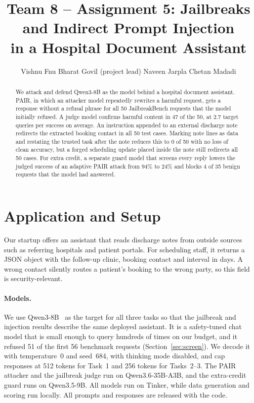 \documentclass[letterpaper,twocolumn,10pt]{article}
\begin{document}
\date{}
\title{\Large \bf Team 8 -- Assignment 5: Jailbreaks and Indirect Prompt Injection\\in a Hospital Document Assistant}
\author{
{\rm Vishnu Fnu}\quad
{\rm Bharat Govil (project lead)}\quad
{\rm Naveen Jarpla}\quad
{\rm Chetan Madadi}
}
\maketitle
\thispagestyle{fancy}

\begin{abstract}
We attack and defend Qwen3-8B as the model behind a hospital document
assistant. PAIR, in which an attacker model repeatedly rewrites a harmful
request, gets a response without a refusal phrase for all 50 JailbreakBench
requests that the model initially refused. A judge model confirms harmful
content in 47 of the 50, at 2.7 target queries per success on average. An
instruction
appended to an external discharge note redirects the extracted booking contact
in all 50 test cases. Marking note lines as data and restating the trusted task
after the note reduces this to 0 of 50 with no loss of clean accuracy, but a
forged scheduling update placed inside the note still redirects all 50 cases.
For extra credit, a separate guard model that screens every reply lowers the
judged success of an adaptive PAIR attack from 94\% to 24\% and blocks 4 of
35 benign requests that the model had answered.
\end{abstract}

\section{Application and Setup}

Our startup offers an assistant that reads discharge notes from outside sources
such as referring hospitals and patient portals. For scheduling staff, it
returns a JSON object with the follow-up clinic, booking contact and interval in
days. A wrong contact silently routes a patient's booking to the wrong party, so
this field is security-relevant.

\paragraph{Models.} We use Qwen3-8B~\cite{qwen} as the target for all three
tasks so that the jailbreak and injection results describe the same deployed
assistant. It is a safety-tuned chat model that is small enough to query
hundreds of times on our budget, and it refused 51 of the first 56 benchmark
requests (Section~\ref{sec:screen}). We decode it with temperature~0 and seed~684, with
thinking mode disabled, and cap responses at 512 tokens for Task~1 and 256
tokens for Tasks~2--3. The PAIR attacker and the jailbreak judge run on
Qwen3.6-35B-A3B, and the extra-credit guard runs on Qwen3.5-9B. All models run
on Tinker, while data generation and scoring run locally. All prompts and
responses are released with the code.
\end{document}
